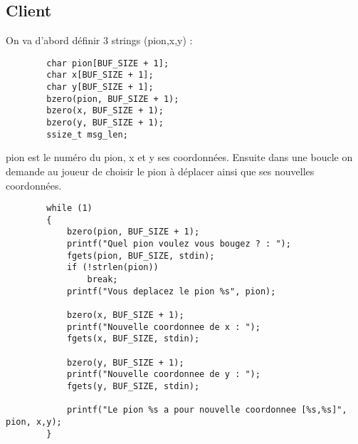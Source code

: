 \documentclass{article}
\begin{document}
    \subsection{Client}
    On va d'abord définir 3 strings (pion,x,y) : 
    \begin{lstlisting}
        char pion[BUF_SIZE + 1];
        char x[BUF_SIZE + 1];
        char y[BUF_SIZE + 1];
        bzero(pion, BUF_SIZE + 1);
        bzero(x, BUF_SIZE + 1);
        bzero(y, BUF_SIZE + 1);
        ssize_t msg_len;
    \end{lstlisting}
    pion est le numéro du pion, x et y ses coordonnées.
    \newpage
    Ensuite dans une boucle on demande au joueur de choisir le pion à déplacer ainsi que ses nouvelles coordonnées.
    \begin{lstlisting}
        while (1)
        {
            bzero(pion, BUF_SIZE + 1);
            printf("Quel pion voulez vous bougez ? : ");
            fgets(pion, BUF_SIZE, stdin);
            if (!strlen(pion))
                break;
            printf("Vous deplacez le pion %s", pion);

            bzero(x, BUF_SIZE + 1);
            printf("Nouvelle coordonnee de x : ");
            fgets(x, BUF_SIZE, stdin);

            bzero(y, BUF_SIZE + 1);
            printf("Nouvelle coordonnee de y : ");
            fgets(y, BUF_SIZE, stdin);

            printf("Le pion %s a pour nouvelle coordonnee [%s,%s]", pion, x,y);
        }
    \end{lstlisting}
\end{document}
